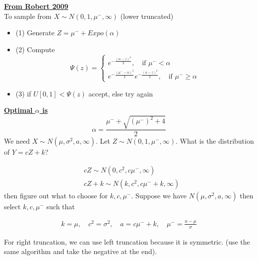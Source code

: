 \documentclass[a4paper, 11pt]{report}
\begin{document}
\bigskip

\bigskip

\underline{{\bf From Robert 2009}}\\

To sample from $X\sim N(0,1,\mu^-,\infty)$ (lower truncated)

\begin{itemize}
\item(1) Generate $Z=\mu^-+Expo(\alpha)$
\item(2) Compute 
\[
\Psi(z)=\left\{ 
\begin{array}{c}
e^{-\frac{(\alpha-z)^2}{2}}, \quad\text{if } \mu^-<\alpha\\ 
e^{-\frac{(\mu^--\alpha)^2}{2}}e^{-\frac{(\alpha-z)^2}{2}}, \quad\text{if } \mu^-\geq\alpha
\end{array}
\right. 
\]
\item(3) if $U[0,1]<\Psi(z)$ accept, else try again
\end{itemize}

\bigskip

\bigskip

\underline{{\bf Optimal $\alpha$ is}}\\
\begin{equation}
\alpha=\frac{\mu^-+\sqrt{(\mu^-)^2+4}}{2}\nonumber
\end{equation}
We need $X\sim N(\mu,\sigma^2,a,\infty)$. Let $Z\sim N(0,1,\mu^-,\infty)$. What is the distribution of $Y=cZ+k$?

\begin{equation}
\begin{aligned}
&cZ\sim N(0,c^2,c\mu^-,\infty)\\
&cZ+k\sim N(k,c^2,c\mu^-+k,\infty)
\end{aligned} \nonumber
\end{equation}
then figure out what to choose for $k,c,\mu^-$. Suppose we have $N(\mu,\sigma^2,a,\infty)$ then select $ k,c,\mu^-$ such that

\begin{equation}
\begin{aligned}
k=\mu,\quad c^2=\sigma^2,\quad a=c\mu^-+k,\quad \mu^-=\frac{a-\mu}{\sigma}
\end{aligned} \nonumber
\end{equation}

For right truncation, we can use left truncation because it is symmetric. (use the same algorithm and take the negative at the end).
\end{document}
